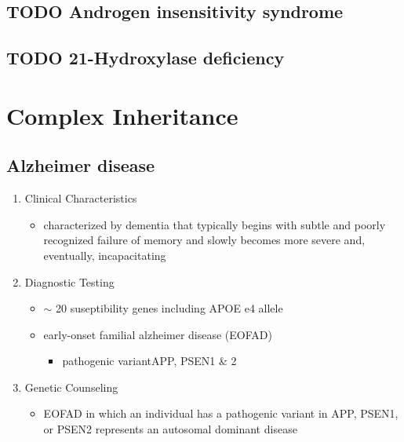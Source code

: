 \documentclass[12pt]{scrartcl}
\begin{document}
\subsection{{\bfseries\sffamily TODO} Androgen insensitivity syndrome}
\label{sec:org1445484}
\subsection{{\bfseries\sffamily TODO} 21-Hydroxylase deficiency}
\label{sec:org1858351}

\section{Complex Inheritance}
\label{sec:org15b0833}
\subsection{Alzheimer disease}
\label{sec:org609916c}
\begin{enumerate}
\item Clinical Characteristics
\label{sec:org9745ed7}
\begin{itemize}
\item characterized by dementia that typically begins with subtle and
poorly recognized failure of memory and slowly becomes more severe
and, eventually, incapacitating
\end{itemize}
\item Diagnostic Testing
\label{sec:orga16c9cd}
\begin{itemize}
\item \(\sim\) 20 suseptibility genes including APOE e4 allele
\item early-onset familial alzheimer disease (EOFAD)
\begin{itemize}
\item pathogenic variantAPP, PSEN1 \& 2
\end{itemize}
\end{itemize}
\item Genetic Counseling
\label{sec:org572c87f}
\begin{itemize}
\item EOFAD in which an individual has a pathogenic variant in APP, PSEN1,
or PSEN2 represents an autosomal dominant disease
\end{itemize}
\end{enumerate}
\end{document}
